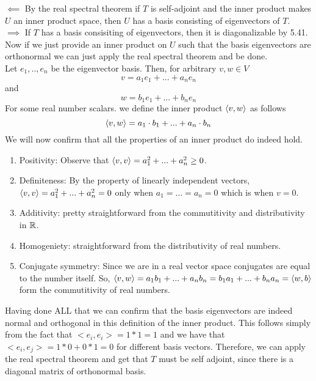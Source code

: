 \documentclass[10pt, twocolumn]{article}
\begin{document}
\begin{q}[14]
    $ \impliedby $ By the real spectral theorem if $ T $ is self-adjoint and the inner product makes $ U $ an inner product space, 
    then $ U $ has a basis consisting of eigenvectors of $ T $. \\
    $ \implies $ If $ T $ has a basis consisiting of eigenvectors, then it is diagonalizable by 5.41. 
    Now if we just provide an inner product on $ U $ such that the basis eigenvectors are orthonormal we can just apply the real spectral theorem and be done.\\
    Let $ e_1, .., e_n $ be the eigenvector basis. Then, for arbitrary $ v, w \in V $ 
    $$ v = a_1 e_1 + ... + a_n e_n $$
    and 
    $$ w = b_1 e_1 + ... + b_n e_n $$
    For some real number scalars.
    we define the inner product $ \langle v, w\rangle $ as follows 
    $$ \langle v, w\rangle = a_1 \cdot b_1 + ... + a_n \cdot b_n $$
    We will now confirm that all the properties of an inner product do indeed hold.
    \begin{enumerate}
        \item Positivity: Observe that $ \langle v, v\rangle = a_1^2 + ... + a_n^2 \geq 0 $.
        \item Definiteness: By the property of linearly independent vectors, 
        $ \langle v, v\rangle = a_1^2 + ... + a_n^2 = 0 $ only when $ a_1 = ... = a_n = 0 $ which is when $ v = 0 $.
        \item Additivity: pretty straightforward from the commutitivity and distributivity in $ \mathbb{R} $.
        \item Homogeniety: straightforward from the distributivity of real numbers.
        \item Conjugate symmetry: Since we are in a real vector space conjugates are equal to the number itself. 
        So, $ \langle v, w\rangle = a_1 b_1 + ... + a_n b_n = b_1 a_1 + ... + b_n a_n = \langle w, b\rangle $ form the commutitivity of real numbers.
    \end{enumerate}
    Having done ALL that we can confirm that the basis eigenvectors are indeed normal and orthogonal in this definition of the inner product.
    This follows simply from the fact that $ <e_i, e_i > = 1 * 1 = 1 $ and we have that  $ < e_i, e_j > = 1 * 0 + 0 * 1 = 0 $ for different basis vectors. 
    Therefore, we can apply the real spectral theorem and get that $ T $ must be self adjoint, since there is a diagonal matrix of orthonormal basis.
\end{q}
\end{document}
